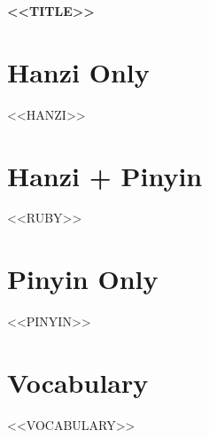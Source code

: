 \documentclass[12pt]{article}
\newcommand{\HanziSize}{\fontsize{25pt}{40pt}\selectfont}
\newcommand{\LatinSize}{\fontsize{14pt}{20pt}\selectfont}
\renewcommand{\LARGE}{\fontsize{30pt}{40pt}\selectfont}
\begin{document}
\begin{center}
    {\LARGE \textbf{<<TITLE>>}}
\end{center}

\vspace{1cm}

\section*{Hanzi Only}
\HanziSize
<<HANZI>>

\newpage
\section*{Hanzi + Pinyin}
\HanziSize
<<RUBY>>

\newpage
\section*{Pinyin Only}
\LatinSize
<<PINYIN>>

\newpage
\section*{Vocabulary}
\LatinSize
<<VOCABULARY>>
\end{document}
